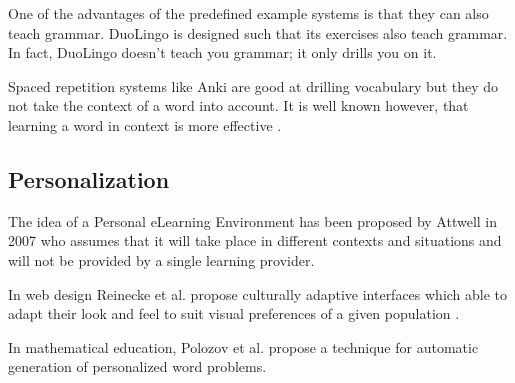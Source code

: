 One of the advantages of the predefined example systems is that they can also teach grammar. DuoLingo is designed such that its exercises also teach grammar. In fact, DuoLingo doesn't teach you grammar; it only drills you on it. 

Spaced repetition systems like Anki are good at drilling vocabulary but they do not take the context of a word into account. It is well known however, that learning a word in context is more effective \cite{nagy95-context}.

\subsection{Personalization}

The idea of a Personal eLearning Environment has been proposed by Attwell in 2007 \cite{Atwell07-personal} who assumes that it will take place in different contexts and situations and will not be provided by a single learning provider.

In web design Reinecke et al. propose culturally adaptive interfaces which able to adapt their look and feel to suit visual preferences of a given population \cite{Reinecke13-CulturalAdaptation}. 

In mathematical education, Polozov et al. propose a technique for automatic generation of personalized word problems\cite{Polozov15-AdaptableMath}.









